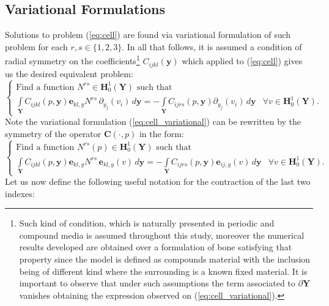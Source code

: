 \subsection{Variational Formulations}
Solutions to problem (\ref{eq:cell}) are found via variational formulation of such problem for each $r,s \in \{1,2,3\}$. In all that follows, it is assumed a condition of radial symmetry on the coefficients\footnote{Such kind of condition, which is naturally presented in periodic and compound media is assumed throughout this study, moreover the numerical results developed are obtained over a formulation of bone satisfying that property since the model is defined as compounds material with the inclusion being of different kind where the surrounding is a known fixed material. It is important to observe that under such assumptions the term associated to $\partial \mathbf{Y}$ vanishes obtaining the expression observed on (\ref{eq:cell_variational}).} $C_{ijkl}(\mathbf{y})$ which applied to (\ref{eq:cell}) gives us the desired equivalent problem:
\begin{equation}
    \label{eq:cell_variational}
    \left \{
    \begin{array}{cc}
        \text{Find a function } N^{rs} \in \mathbf{H}^1_{0}(\mathbf{Y}) \text{ such that } & \quad \\
        \int\limits_{\mathbf{Y}} C_{ijkl}(p,\mathbf{y})\mathbf{e}_{kl,y} N^{rs} \, \partial_{y_j}(v_i)\,d\mathbf{y} = -\int\limits_{\mathbf{Y}} C_{ijrs}(p, \mathbf{y}) \partial_{y_j}(v_i)\,d\mathbf{y} &  \forall v \in \mathbf{H}^1_{0}(\mathbf{Y}).
    \end{array}
    \right.
\end{equation}
Note the variational formulation (\ref{eq:cell_variational}) can be rewritten by the symmetry of the operator $\mathbf{C}(\cdot,p)$ in the form:
\begin{equation}
    \label{eq:cell_symmetric}
    \left \{
    \begin{array}{cc}
        \text{Find a function } N^{rs}(p) \in \mathbf{H}^1_{0}(\mathbf{Y}) \text{ such that } & \quad\\
        \int\limits_{\mathbf{Y}} C_{ijkl}(p,\mathbf{y})\mathbf{e}_{kl,y} N^{rs}\, \mathbf{e}_{kl,y}(v)\,d\mathbf{y} = -\int\limits_{\mathbf{Y}} C_{ijrs}(p,\mathbf{y}) \mathbf{e}_{ij,y}(v)\,d\mathbf{y} &\forall v \in \mathbf{H}^1_{0}(\mathbf{Y}).
    \end{array}
    \right.
\end{equation}
Let us now define the following useful notation for the contraction of the last two indexes:
